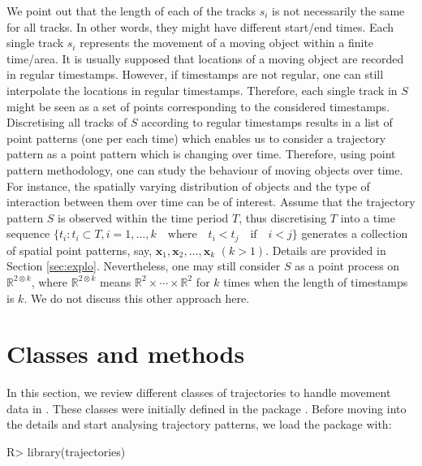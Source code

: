 \documentclass[article]{jss}
\newcommand{\R}{\mathbb{R}}
\begin{document}
  We point out that the length of each of the tracks $s_i$ is not necessarily the same for all tracks. In other words, they might have different start/end times. Each single track $s_i$ represents the movement of a moving object within a finite time/area. It is usually supposed that locations of a moving object are recorded in regular timestamps. However, if timestamps are not regular, one can still interpolate the locations in regular timestamps. Therefore, each single track in $S$ might be seen as a set of points corresponding to the considered timestamps. Discretising all tracks of $S$ according to regular timestamps results in a list of point patterns (one per each time) which enables us to consider a trajectory pattern as a point pattern which is changing over time. Therefore, using point pattern methodology, one can study the behaviour of moving objects over time. For instance, the spatially varying distribution of objects and the type of interaction between them over time can be of interest. Assume that the trajectory pattern $S$ is observed within the time period $T$, thus discretising $T$ into a time sequence $\{t_i: t_i \subset T, i=1,\ldots,k \quad \text{where} \quad t_i < t_j \quad \text{if} \quad i< j \}$ generates a collection of spatial point patterns, say, $\textbf{x}_1,\textbf{x}_2, \ldots, \textbf{x}_k$ $(k>1)$.  Details are provided in Section \ref{sec:explo}. Nevertheless, one may still consider $S$ as a point process on $\R^{2\otimes k}$, where $\R^{2\otimes k}$ means $\R^2 \times \cdots \times \R^2$ for $k$ times when the length of timestamps is $k$. We do not discuss this other approach here.

\section{Classes and methods} \label{sec:classes}
In this section, we review different classes of trajectories to handle movement data in . These classes were initially defined in the  package  \citep{spacetime}. Before moving into the details and start analysing trajectory patterns, we load the package with:

\begin{Schunk}
\begin{Sinput}
R> library(trajectories)
\end{Sinput}
\end{Schunk}
\end{document}
